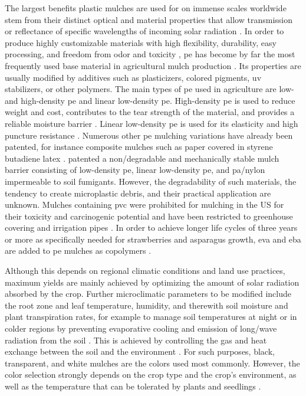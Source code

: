 The largest benefits plastic mulches are used for on immense scales worldwide stem from their distinct optical and material properties that allow transmission or reflectance of specific wavelengths of incoming solar radiation \citep{BrownBlack2001,Chalker-ScottImpact2007,CsizinszkyColor1995,GordonPlastic2008,HaynesUse1987}. In order to produce highly customizable materials with high flexibility, durability, easy processing, and freedom from odor and toxicity \citep{WrightIns2019}, \ac{pe} has become by far the most frequently used base material in agricultural mulch production \citep{Diaz-PerezBell2010,KaraEffects2013,LocascioRed2005,SivanNew2011}. Its properties are usually modified by additives such as plasticizers, colored pigments, \ac{uv} stabilizers, or other polymers. The main types of \ac{pe} used in agriculture are low- and high-density \ac{pe} and linear low-density \ac{pe}.
High-density \ac{pe} is used to reduce weight and cost, contributes to the tear strength of the material, and provides a reliable moisture barrier \citep{LamontPlastics2005}. Linear low-density \ac{pe} is used for its elasticity and high puncture resistance \citep{AnthonyMultilayer1983}. Numerous other \ac{pe} mulching variations have already been patented, for instance composite mulches such as paper covered in styrene butadiene latex \citep{DalebrouxMulching1997}.
\citet{SabbaghAgricultural2010} patented a non\-/degradable and mechanically stable mulch barrier consisting of low-density \ac{pe}, linear low-density \ac{pe}, and \ac{pa}\slash nylon impermeable to soil fumigants. However, the degradability of such materials, the tendency to create microplastic debris, and their practical application are unknown. Mulches containing \ac{pvc} were prohibited for mulching in the US for their toxicity and carcinogenic potential \citep{USEPAGuidelines2012} and have been restricted to greenhouse covering and irrigation pipes \citep{Scarascia-MugnozzaPlastic2011}. In order to achieve longer life cycles of three years or more \citep{BrucknerSpargelanbau2008} as specifically needed for strawberries and asparagus growth, \ac{eva} and \ac{eba} are added to \ac{pe} mulches as copolymers \citep{EspiPlastic2006}.

Although this depends on regional climatic conditions and land use practices, maximum yields are mainly achieved by optimizing the amount of solar radiation absorbed by the crop. Further microclimatic parameters to be modified include the root zone and leaf temperature, humidity, and therewith soil moisture and plant transpiration rates, for example to manage soil temperatures at night or in colder regions by preventing evaporative cooling and emission of long\-/wave radiation from the soil \citep{HamOptical1993}. This is achieved by controlling the gas and heat exchange between the soil and the environment \citep{LamontPlastic1993,TararaMicroclimate2000}. For such purposes, black, transparent, and white mulches are the colors used most commonly. However, the color selection strongly depends on the crop type and the crop's environment, as well as the temperature that can be tolerated by plants and seedlings \citep{LamontPlastic1993,TararaMicroclimate2000}.

